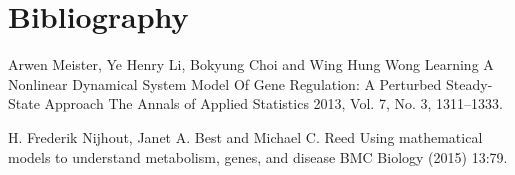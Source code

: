 \section{Bibliography}


\begin{thebibliography}{00}

Arwen Meister, Ye Henry Li, Bokyung Choi and Wing Hung Wong
\newblock Learning A Nonlinear Dynamical System Model Of Gene Regulation: A Perturbed Steady-State Approach
\newblock The Annals of Applied Statistics 2013, Vol. 7, No. 3, 1311–1333.

H. Frederik Nijhout, Janet A. Best and Michael C. Reed
\newblock Using mathematical models to understand metabolism, genes, and disease
\newblock BMC Biology (2015) 13:79.


\end{thebibliography}



